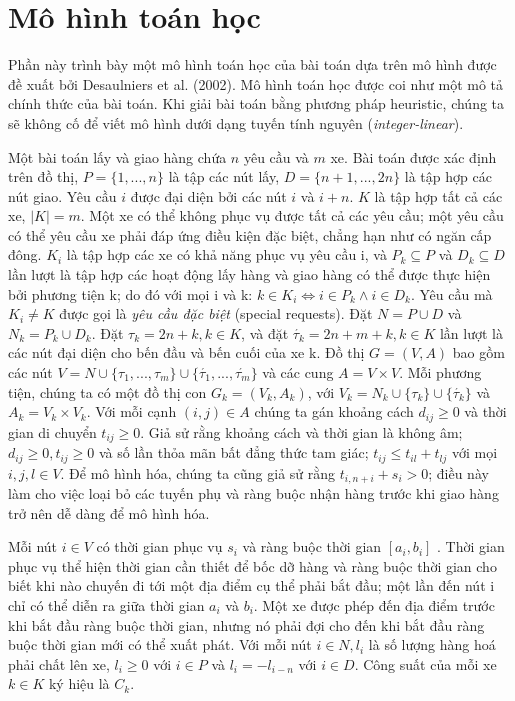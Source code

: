 \chapter{Mô hình toán học}
Phần này trình bày một mô hình toán học của bài toán dựa trên mô hình được đề xuất bởi Desaulniers et al. (2002). Mô hình toán học được coi như một mô tả chính thức của bài toán. Khi giải bài toán bằng phương pháp heuristic, chúng ta sẽ không cố để viết mô hình dưới dạng tuyến tính nguyên (\textit{integer-linear}).

Một bài toán lấy và giao hàng chứa $n$ yêu cầu và $m$ xe. Bài toán được xác định trên đồ thị, $P = \{1,...,n\}$ là tập các nút lấy, $D=\{n+1,...,2n\}$ là tập hợp các nút giao. Yêu cầu $i$ được đại diện bởi các nút $i$ và $i + n$. $K$ là tập hợp tất cả các xe, $|K|=m$. Một xe có thể không phục vụ được tất cả các yêu cầu; một yêu cầu có thể yêu cầu xe phải đáp ứng điều kiện đặc biệt, chẳng hạn như có ngăn cấp đông. $K_i$ là tập hợp các xe có khả năng phục vụ yêu cầu i, và $P_k \subseteq P$ và $D_k \subseteq D$ lần lượt là tập hợp các hoạt động lấy hàng và giao hàng có thể được thực hiện bởi phương tiện k; do đó với mọi i và k: $k \in K_i \Leftrightarrow i \in P_k \land i \in D_k $. Yêu cầu mà $K_i \ne K$ được gọi là \textit{yêu cầu đặc biệt} (special requests). Đặt $N = P \cup D$ và $N_k = P_k \cup D_k$. Đặt $\tau_k = 2n +k, k \in K$, và đặt $\acute{\tau_k} = 2n + m +k, k \in K$ lần lượt là các nút đại diện cho bến đầu và bến cuối của xe k. 
Đồ thị $G = (V,A)$ bao gồm các nút $V= N \cup \{ \tau_1,...,\tau_m\} \cup \{\acute{\tau_1},...,\acute{\tau_m}\}$ và các cung $A = V \times V$. Mỗi phương tiện, chúng ta có một đồ thị con $G_k = (V_k, A_k)$, với $V_k = N_k \cup \{\tau_k\} \cup \{\acute{\tau_k}\}$ và $A_k =V_k \times V_k$. Với mỗi cạnh $(i, j) \in A$ chúng ta gán khoảng cách $d_{ij} \geq 0$ và thời gian di chuyển $t_{ij} \geq 0$. Giả sử rằng khoảng cách và thời gian là không âm; $d_{ij} \geq 0, t_{ij} \geq 0$ và số lần thỏa mãn bất đẳng thức tam giác; $t_{ij} \leq t_{il} + t_{lj}$ với mọi $i, j, l \in V$.
Để mô hình hóa, chúng ta cũng giả sử rằng $t_{i,n+i} + s_i > 0$; điều này làm cho việc loại bỏ các tuyến phụ và ràng buộc nhận hàng trước khi giao hàng trở nên dễ dàng để mô hình hóa.

Mỗi nút $i \in V$ có thời gian phục vụ $s_i$ và ràng buộc thời gian $[a_i, b_i]$ . Thời gian phục vụ thể hiện thời gian cần thiết để bốc dỡ hàng và ràng buộc thời gian cho biết khi nào chuyến đi tới một địa điểm cụ thể phải bắt đầu; một lần đến nút i chỉ có thể diễn ra giữa thời gian $a_i$ và $b_i$. Một xe được phép đến địa điểm trước khi bắt đầu ràng buộc thời gian, nhưng nó phải đợi cho đến khi bắt đầu ràng buộc thời gian mới có thể xuất phát. Với mỗi nút $i \in N, l_i$ là số lượng hàng hoá phải chất lên xe, $l_i \geq 0$ với $i \in P$ và $l_i = -l_{i-n}$ với $i \in D$. Công suất của mỗi xe $k \in K$ ký hiệu là $C_k$.

